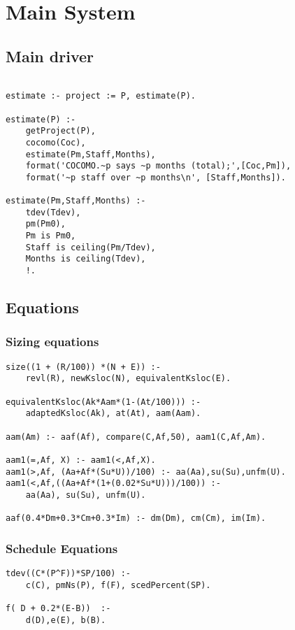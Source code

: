 \section{Main System
}
\subsection{ Main driver }\begin{Verbatim}

estimate :- project := P, estimate(P).

estimate(P) :-
	getProject(P),
	cocomo(Coc),
	estimate(Pm,Staff,Months),
	format('COCOMO.~p says ~p months (total);',[Coc,Pm]),
	format('~p staff over ~p months\n', [Staff,Months]).

estimate(Pm,Staff,Months) :-
	tdev(Tdev),
	pm(Pm0),
	Pm is Pm0,
	Staff is ceiling(Pm/Tdev),
	Months is ceiling(Tdev),
	!.
\end{Verbatim}
\subsection{ Equations
}
\subsubsection{ Sizing equations }\begin{Verbatim}
size((1 + (R/100)) *(N + E)) :- 
	revl(R), newKsloc(N), equivalentKsloc(E).

equivalentKsloc(Ak*Aam*(1-(At/100))) :- 
	adaptedKsloc(Ak), at(At), aam(Aam).

aam(Am) :- aaf(Af), compare(C,Af,50), aam1(C,Af,Am).

aam1(=,Af, X) :- aam1(<,Af,X).
aam1(>,Af, (Aa+Af*(Su*U))/100) :- aa(Aa),su(Su),unfm(U).
aam1(<,Af,((Aa+Af*(1+(0.02*Su*U)))/100)) :-
	aa(Aa), su(Su), unfm(U).

aaf(0.4*Dm+0.3*Cm+0.3*Im) :- dm(Dm), cm(Cm), im(Im).
\end{Verbatim}
\subsubsection{ Schedule Equations }\begin{Verbatim}
tdev((C*(P^F))*SP/100) :-
	c(C), pmNs(P), f(F), scedPercent(SP).

f( D + 0.2*(E-B))  :-
	d(D),e(E), b(B).
\end{Verbatim}
